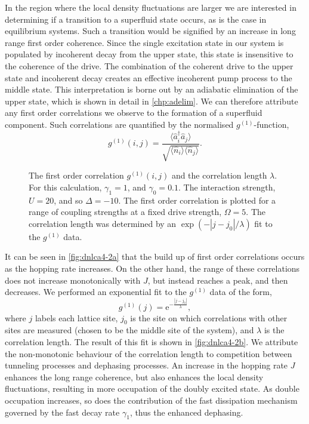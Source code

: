 In the region where the local density fluctuations are larger we are interested in determining if a transition to a superfluid state occurs, as is the case in equilibrium systems. Such a transition would be signified by an increase in long range first order coherence. Since the single excitation state in our system is populated by incoherent decay from the upper state, this state is insensitive to the coherence of the drive. The combination of the coherent drive to the upper state and incoherent decay creates an effective incoherent pump process to the middle state. This interpretation is borne out by an adiabatic elimination of the upper state, which is shown in detail in \cref{chp:adelim}. We can therefore attribute any first order correlations we observe to the formation of a superfluid component. Such correlations are quantified by the normalised \(g^{(1)}\)-function,
\begin{equation}
	g^{(1)}(i,j) = \frac{\langle \hat{a}_{i}^{\dagger} \hat{a}_{j} \rangle}{\sqrt{\langle \hat{n}_{i} \rangle \langle \hat{n}_{j} \rangle}}.
	\label{eq:dnlca4-1}
\end{equation}

\begin{figure}[ht]
	 \hfill
	\caption{\label{fig:dnlca4-2} The first order correlation \(g^{(1)}(i,j)\) and the correlation length $\lambda$. For this calculation, \(\gamma_{1} = 1\), and \(\gamma_{0} = 0.1\). The interaction strength, \(U = 20\), and so \(\Delta = -10\). The first order correlation is plotted for a range of coupling strengths at a fixed drive strength, \(\Omega = 5\). The correlation length was determined by an \(\exp(- |j-j_{0}|/\lambda)\) fit to the \(g^{(1)}\) data.}
\end{figure}

It can be seen in \cref{fig:dnlca4-2a} that the build up of first order correlations occurs as the hopping rate increases. On the other hand, the range of these correlations does not increase monotonically with \(J\), but instead reaches a peak, and then decreases. We performed an exponential fit to the \(g^{(1)}\) data of the form,
\begin{equation}
	g^{(1)}(j) = \mathrm{e}^{-\frac{|j-j_{0}|}{\lambda}},
	\label{eq:dnlca4-2}
\end{equation}
where \(j\) labels each lattice site, \(j_{0}\) is the site on which correlations with other sites are measured (chosen to be the middle site of the system), and \(\lambda\) is the correlation length. The result of this fit is shown in \cref{fig:dnlca4-2b}. We attribute the non-monotonic behaviour of the correlation length to competition between tunneling processes and dephasing processes. An increase in the hopping rate \(J\) enhances the long range coherence, but also enhances the local density fluctuations, resulting in more occupation of the doubly excited state. As double occupation increases, so does the contribution of the fast dissipation mechanism governed by the fast decay rate \(\gamma_{1}\), thus the enhanced dephasing.


